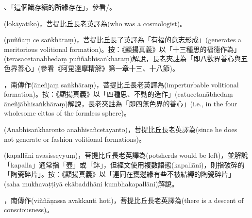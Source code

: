 \startitemgroup[noteitems]
\item{}、「這個識存續的所緣存在」，參看/。
\stopitemgroup

\startitemgroup[noteitems]
\item{}(lokāyatiko)，菩提比丘長老英譯為(who was a cosmologist)。
\stopitemgroup

\startitemgroup[noteitems]
\item{}(puññaṃ ce saṅkhāraṃ)，菩提比丘長了英譯為「有福的意志形成」(generates a meritorious volitional formation)。按：《顯揚真義》以「十三種思的福德作為」(terasacetanābhedaṃ puññābhisaṅkhāraṃ)解說，長老夾註為「即八欲界善心與五色界善心」(參看《阿毘達摩精解》第一章十三、十八節)。
\stopitemgroup

\startitemgroup[noteitems]
\item{}，南傳作(āneñjaṃ saṅkhāraṃ)，菩提比丘長老英譯為(imperturbable volitional formation)。按：《顯揚真義》以「四種思、不動的造作」(catucetanābhedaṃ āneñjābhisaṅkhāraṃ)解說，長老夾註為「即四無色界的善心」(i.e., in the four wholesome cittas of the formless sphere)。
\stopitemgroup

\startitemgroup[noteitems]
\item{}(Anabhisaṅkharonto anabhisañcetayanto)，菩提比丘長老英譯為(since he does not generate or fashion volitional formations)。
\stopitemgroup

\startitemgroup[noteitems]
\item{}(kapallāni avasisseyyuṃ)，菩提比丘長老英譯為(potsherds would be left)，並解說「kapalla」通常指「壺」或「鉢」，但經文使用複數語態(kapallāni)，則指破碎的「陶瓷碎片」。按：《顯揚真義》以「連同在甕邊緣有些不被結縛的陶瓷碎片」(saha mukhavaṭṭiyā ekābaddhāni kumbhakapallāni)解說。
\stopitemgroup

\startitemgroup[noteitems]
\item{}，南傳作(viññāṇassa avakkanti hoti)，菩提比丘長老英譯為(there is a descent of consciousness)。
\stopitemgroup

